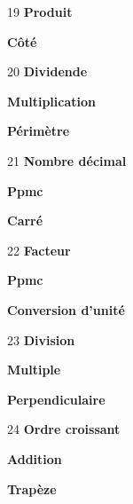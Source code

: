 \begin{tcbraster}[raster columns=3, raster column skip=0pt, raster row skip=0pt, raster valign=top]
\begin{fiche}{19}
\textbf{\large Produit}\par
\textbf{\large Côté}
\end{fiche}
\begin{fiche}{20}
\textbf{\large Dividende}\par
\textbf{\large Multiplication}\par
\textbf{\large Périmètre}
\end{fiche}
\begin{fiche}{21}
\textbf{\large Nombre décimal}\par
\textbf{\large Ppmc}\par
\textbf{\large Carré}
\end{fiche}
\begin{fiche}{22}
\textbf{\large Facteur}\par
\textbf{\large Ppmc}\par
\textbf{\large Conversion d'unité}
\end{fiche}
\begin{fiche}{23}
\textbf{\large Division}\par
\textbf{\large Multiple}\par
\textbf{\large Perpendiculaire}
\end{fiche}
\begin{fiche}{24}
\textbf{\large Ordre croissant}\par
\textbf{\large Addition}\par
\textbf{\large Trapèze}
\end{fiche}
\end{tcbraster}